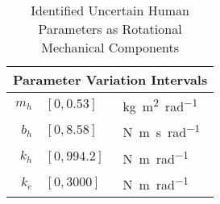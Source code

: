 \begin{table}%
\caption[Identified Uncertain Human Parameters as Rotational Mechanical Components]{Identified Uncertain Human Parameters 
as Rotational Mechanical Components}
\centering
\begin{tabular}{r l l}\toprule
\multicolumn{3}{c}{Parameter Variation Intervals}\\\midrule
$m_h$ & $[0,0.53]$ &\si{\kilo\gram\meter\squared\per\radian}\\
$b_h$ & $[0,8.58]$ &\si{\newton\meter\second\per\radian}\\
$k_h$ & $[0,994.2]$ &\si{\newton\meter\per\radian}\\
$k_e$ & $[0,3000]$ &\si{\newton\meter\per\radian}\\
\bottomrule
\end{tabular}
\label{tab:app:humparam}
\end{table}

